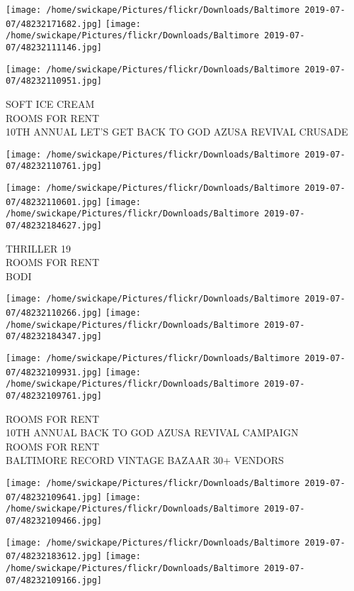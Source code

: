 \documentclass[10pt,letterpaper]{article}
\begin{document}
\texttt{[image: /home/swickape/Pictures/flickr/Downloads/Baltimore 2019-07-07/48232171682.jpg]}
\texttt{[image: /home/swickape/Pictures/flickr/Downloads/Baltimore 2019-07-07/48232111146.jpg]}

\texttt{[image: /home/swickape/Pictures/flickr/Downloads/Baltimore 2019-07-07/48232110951.jpg]}

SOFT ICE CREAM\\
ROOMS FOR RENT\\
10TH ANNUAL LET'S GET BACK TO GOD AZUSA REVIVAL CRUSADE
\pagebreak

\texttt{[image: /home/swickape/Pictures/flickr/Downloads/Baltimore 2019-07-07/48232110761.jpg]}

\vspace{0.25in}
\texttt{[image: /home/swickape/Pictures/flickr/Downloads/Baltimore 2019-07-07/48232110601.jpg]}
\texttt{[image: /home/swickape/Pictures/flickr/Downloads/Baltimore 2019-07-07/48232184627.jpg]}

THRILLER 19\\
ROOMS FOR RENT\\
BODI
\pagebreak

\texttt{[image: /home/swickape/Pictures/flickr/Downloads/Baltimore 2019-07-07/48232110266.jpg]}
\texttt{[image: /home/swickape/Pictures/flickr/Downloads/Baltimore 2019-07-07/48232184347.jpg]}

\texttt{[image: /home/swickape/Pictures/flickr/Downloads/Baltimore 2019-07-07/48232109931.jpg]}
\texttt{[image: /home/swickape/Pictures/flickr/Downloads/Baltimore 2019-07-07/48232109761.jpg]}

ROOMS FOR RENT\\
10TH ANNUAL BACK TO GOD AZUSA REVIVAL CAMPAIGN\\
ROOMS FOR RENT\\
BALTIMORE RECORD VINTAGE BAZAAR 30+ VENDORS
\pagebreak

\texttt{[image: /home/swickape/Pictures/flickr/Downloads/Baltimore 2019-07-07/48232109641.jpg]}
\texttt{[image: /home/swickape/Pictures/flickr/Downloads/Baltimore 2019-07-07/48232109466.jpg]}

\texttt{[image: /home/swickape/Pictures/flickr/Downloads/Baltimore 2019-07-07/48232183612.jpg]}
\texttt{[image: /home/swickape/Pictures/flickr/Downloads/Baltimore 2019-07-07/48232109166.jpg]}
\end{document}
